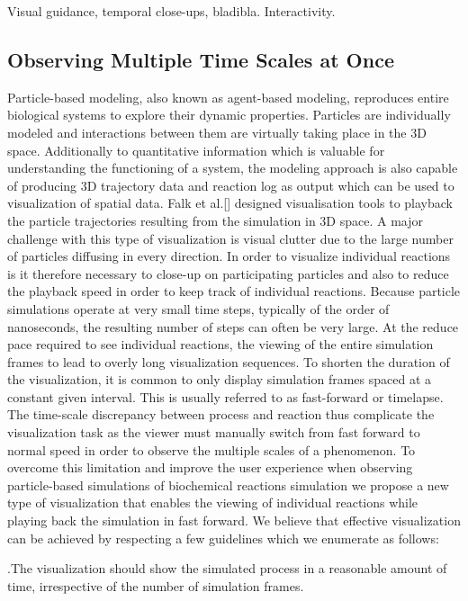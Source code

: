 Visual guidance, temporal close-ups, bladibla.
Interactivity.

\subsection{Observing Multiple Time Scales at Once}

Particle-based modeling, also known as agent-based modeling, reproduces entire biological systems to explore their dynamic properties.
Particles are individually modeled and interactions between them are virtually taking place in the 3D space.
Additionally to quantitative information which is valuable for understanding the functioning of a system, the modeling approach is also capable of producing 3D trajectory data and reaction log as output which can be used to visualization of spatial data.
Falk et al.[] designed visualisation tools to playback the particle trajectories resulting from the simulation in 3D space.
A major challenge with this type of visualization is visual clutter due to the large number of particles diffusing in every direction.
In order to visualize individual reactions is it therefore necessary to close-up on participating particles and also to reduce the playback speed in order to keep track of individual reactions.
Because particle simulations operate at very small time steps, typically of the order of nanoseconds, the resulting number of steps can often be very large. 
At the reduce pace required to see individual reactions, the viewing of the entire simulation frames to lead to overly long visualization sequences.
To shorten the duration of the visualization, it is common to only display simulation frames spaced at a constant given interval. 
This is usually referred to as fast-forward or timelapse.
The time-scale discrepancy between process and reaction thus complicate the visualization task as the viewer must manually switch from fast forward to normal speed in order to observe the multiple scales of a phenomenon.
To overcome this limitation and improve the user experience when observing particle-based simulations of biochemical reactions simulation we propose a new type of visualization that enables the viewing of individual reactions while playing back the simulation in fast forward.
We believe that effective visualization can be achieved by respecting a few guidelines which we enumerate as follows:

.The visualization should show the simulated process in a reasonable amount of time, irrespective of the number of simulation frames.

